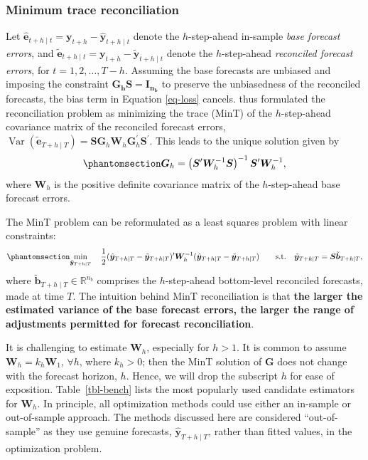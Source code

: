 \documentclass[
  11pt]{article}
\theoremstyle{plain}
\theoremstyle{remark}
\begin{document}
\subsubsection*{Minimum trace
reconciliation}\label{minimum-trace-reconciliation}

Let
\(\hat{\bm{e}}_{t+h \mid t} = \bm{y}_{t+h} - \hat{\bm{y}}_{t+h \mid t}\)
denote the \(h\)-step-ahead in-sample \emph{base forecast errors}, and
\(\tilde{\bm{e}}_{t+h \mid t} = \bm{y}_{t+h} - \tilde{\bm{y}}_{t+h \mid t}\)
denote the \(h\)-step-ahead \emph{reconciled forecast errors}, for
\(t = 1,2,\ldots,T-h\). Assuming the base forecasts are unbiased and
imposing the constraint \(\bm{G_h S}=\bm{I_{n_b}}\) to preserve the
unbiasedness of the reconciled forecasts, the bias term in Equation
\eqref{eq-loss} cancels. \citet{Wickramasuriya2019-fc} thus formulated
the reconciliation problem as minimizing the trace (MinT) of the
\(h\)-step-ahead covariance matrix of the reconciled forecast errors,
\(\operatorname{Var}(\tilde{\bm{e}}_{T+h \mid T})=\bm{S}\bm{G}_h\bm{W}_h\bm{G}^{\prime}_h\bm{S}^{\prime}\).
This leads to the unique solution given by
\begin{equation}\phantomsection\label{eq-mint}{
\bm{G}_h=\left(\bm{S}^{\prime} \bm{W}_h^{-1} \bm{S}\right)^{-1} \bm{S}^{\prime} \bm{W}_h^{-1},
}\end{equation} where \(\bm{W}_h\) is the positive definite covariance
matrix of the \(h\)-step-ahead base forecast errors.

The MinT problem can be reformulated as a least squares problem with
linear constraints: \begin{equation}\phantomsection\label{eq-mint_op}{
\min_{\tilde{\bm{y}}_{T+h \mid T}} \quad \frac{1}{2}(\hat{\bm{y}}_{T+h \mid T}-\tilde{\bm{y}}_{T+h \mid T})^{\prime} \bm{W}_{h}^{-1}(\hat{\bm{y}}_{T+h \mid T}-\tilde{\bm{y}}_{T+h \mid T})
 \qquad \text{s.t.} \quad \tilde{\bm{y}}_{T+h \mid T}=\bm{S}\tilde{\bm{b}}_{T+h \mid T},
}\end{equation} where
\(\tilde{\bm{b}}_{T+h \mid T} \in \mathbb{R}^{n_b}\) comprises the
\(h\)-step-ahead bottom-level reconciled forecasts, made at time \(T\).
The intuition behind MinT reconciliation is that \textbf{the larger the
estimated variance of the base forecast errors, the larger the range of
adjustments permitted for forecast reconciliation}.

It is challenging to estimate \(\bm{W}_h\), especially for \(h > 1\). It
is common to assume \(\bm{W}_h = k_h\bm{W}_1\), \(\forall h\), where
\(k_h > 0\); then the MinT solution of \(\bm{G}\) does not change with
the forecast horizon, \(h\). Hence, we will drop the subscript \(h\) for
ease of exposition. Table~\ref{tbl-bench} lists the most popularly used
candidate estimators for \(\bm{W}_h\). In principle, all optimization
methods could use either an in-sample or out-of-sample approach. The
methods discussed here are considered ``out-of-sample'' as they use
genuine forecasts, \(\hat{\bm{y}}_{T+h \mid T}\), rather than fitted
values, in the optimization problem.
\end{document}
